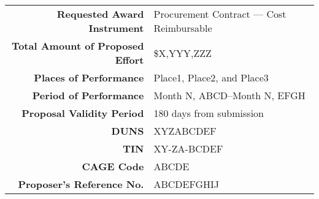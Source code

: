 {\begin{tabular}{rl}
  \textbf{Requested Award Instrument} & Procurement Contract --- Cost Reimbursable \\
  \textbf{Total Amount of Proposed Effort } & \$X,YYY,ZZZ \\
    \textbf{Places of Performance} & Place1, Place2, and Place3\\
    \textbf{Period of Performance} & Month N, ABCD--Month N, EFGH \\
    \textbf{Proposal Validity Period} & 180 days from submission \\
    \textbf{DUNS} & XYZABCDEF \\
    \textbf{TIN} & XY-ZA-BCDEF \\
    \textbf{CAGE Code} & ABCDE \\
    \textbf{Proposer's Reference No.} & ABCDEFGHIJ \\    
\end{tabular}


}

